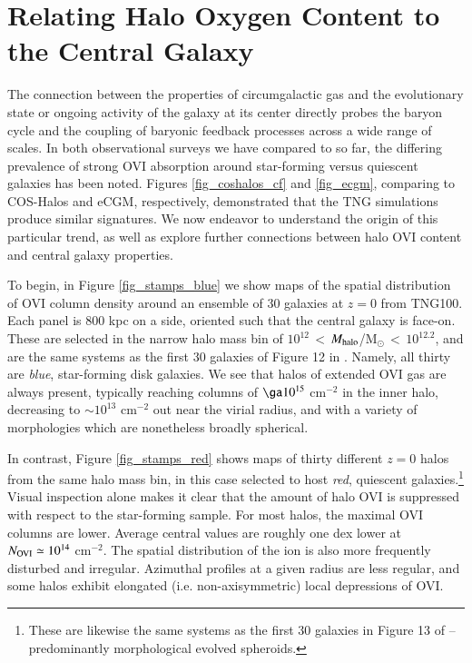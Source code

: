 \documentclass[useAMS,usenatbib]{mnras}
\newcommand{\ovi}{OVI\xspace}
\begin{document}

\section{Relating Halo Oxygen Content to the Central Galaxy} \label{sec_galaxyconnection}

The connection between the properties of circumgalactic gas and the evolutionary state or ongoing activity of the galaxy at its center directly probes the baryon cycle and the coupling of baryonic feedback processes across a wide range of scales. In both observational surveys we have compared to so far, the differing prevalence of strong \ovi absorption around star-forming versus quiescent galaxies has been noted. Figures \ref{fig_coshalos_cf} and \ref{fig_ecgm}, comparing to COS-Halos and eCGM, respectively, demonstrated that the TNG simulations produce similar signatures. We now endeavor to understand the origin of this particular trend, as well as explore further connections between halo \ovi content and central galaxy properties.

To begin, in Figure \ref{fig_stamps_blue} we show maps of the spatial distribution of \ovi column density around an ensemble of 30 galaxies at $z=0$ from TNG100. Each panel is 800 kpc on a side, oriented such that the central galaxy is face-on. These are selected in the narrow halo mass bin of \mbox{$10^{12}$\,$<$\,$M_{\rm halo}$/M$_\odot$\,$<$\,$10^{12.2}$}, and are the same systems as the first 30 galaxies of Figure 12 in \cite{nelson18}. Namely, all thirty are \textit{blue}, star-forming disk galaxies. We see that halos of extended \ovi gas are always present, typically reaching columns of $\ga 10^{15}$ cm$^{-2}$ in the inner halo, decreasing to $\sim 10^{13}$ cm$^{-2}$ out near the virial radius, and with a variety of morphologies which are nonetheless broadly spherical.

In contrast, Figure \ref{fig_stamps_red} shows maps of thirty different $z=0$ halos from the same halo mass bin, in this case selected to host \textit{red}, quiescent galaxies.\footnote{These are likewise the same systems as the first 30 galaxies in Figure 13 of \cite{nelson18} -- predominantly morphological evolved spheroids.} Visual inspection alone makes it clear that the amount of halo \ovi is suppressed with respect to the star-forming sample. For most halos, the maximal \ovi columns are lower. Average central values are roughly one dex lower at $N_{\rm OVI} \simeq 10^{14}$ cm$^{-2}$. The spatial distribution of the ion is also more frequently disturbed and irregular. Azimuthal profiles at a given radius are less regular, and some halos exhibit elongated (i.e. non-axisymmetric) local depressions of \ovi.
\end{document}

